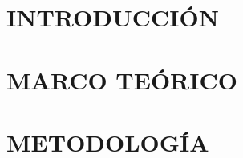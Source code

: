 \documentclass[12pt, oneside]{book}
\begin{document}
\frontmatter



\newpage
\thispagestyle{empty}
\null
\clearpage 
	
\newpage
\setcounter{page}{1}


\newpage




%

\newpage


\newpage


\newpage


\newpage



\newpage
\tableofcontents

\newpage
\listoffigures
 
\newpage
\listoftables

\newpage



\mainmatter
\chapterformatdefault

\chapter{INTRODUCCIÓN}
\thispagestyle{empty}

\chapter{MARCO TEÓRICO}
\thispagestyle{empty}


\chapter{METODOLOGÍA}
\thispagestyle{empty}


\end{document}
